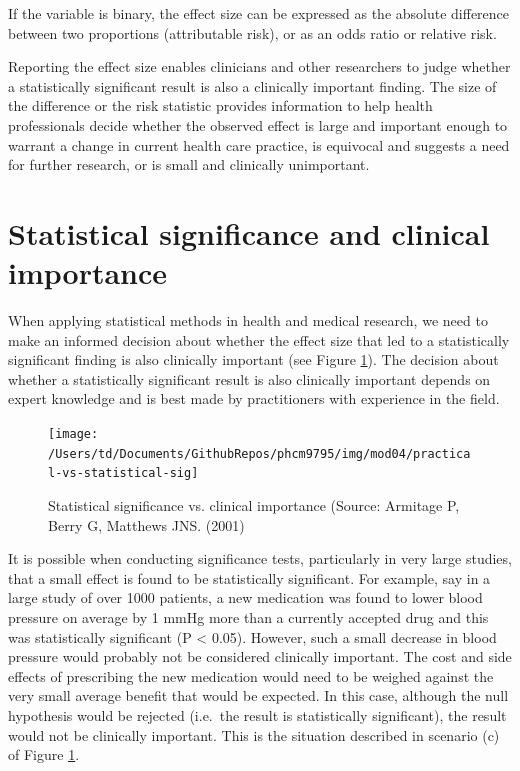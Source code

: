 \documentclass[
]{memoir}
\begin{document}
If the variable is binary, the effect size can be expressed as the absolute difference between two proportions (attributable risk), or as an odds ratio or relative risk.

Reporting the effect size enables clinicians and other researchers to judge whether a statistically significant result is also a clinically important finding. The size of the difference or the risk statistic provides information to help health professionals decide whether the observed effect is large and important enough to warrant a change in current health care practice, is equivocal and suggests a need for further research, or is small and clinically unimportant.

\hypertarget{statistical-significance-and-clinical-importance}{%
\section{Statistical significance and clinical importance}\label{statistical-significance-and-clinical-importance}}

When applying statistical methods in health and medical research, we need to make an informed decision about whether the effect size that led to a statistically significant finding is also clinically important (see Figure \ref{fig:practical-importance}). The decision about whether a statistically significant result is also clinically important depends on expert knowledge and is best made by practitioners with experience in the field.

\begin{figure}
\texttt{[image: /Users/td/Documents/GithubRepos/phcm9795/img/mod04/practical-vs-statistical-sig]} \caption{Statistical significance vs. clinical importance (Source: Armitage P, Berry G, Matthews JNS. (2001)}\label{fig:practical-importance}
\end{figure}

It is possible when conducting significance tests, particularly in very large studies, that a small effect is found to be statistically significant. For example, say in a large study of over 1000 patients, a new medication was found to lower blood pressure on average by 1 mmHg more than a currently accepted drug and this was statistically significant (P \textless{} 0.05). However, such a small decrease in blood pressure would probably not be considered clinically important. The cost and side effects of prescribing the new medication would need to be weighed against the very small average benefit that would be expected. In this case, although the null hypothesis would be rejected (i.e.~the result is statistically significant), the result would not be clinically important. This is the situation described in scenario (c) of Figure \ref{fig:practical-importance}.
\end{document}
